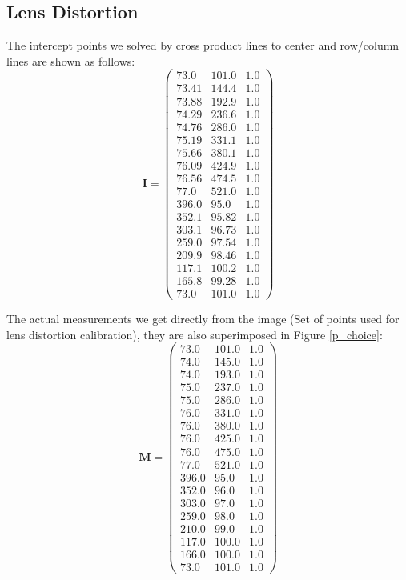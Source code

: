 \documentclass[conference]{IEEEtran}
\newcommand{\mat}[1]{\mathbf{#1}} %
\begin{document}
\subsection{Lens Distortion}
The intercept points we solved by cross product lines to center and row/column lines are shown as follows:
\begin{equation}
	\mat{I} = \left(\begin{array}{ccc} 73.0 & 101.0 & 1.0\\ 73.41 & 144.4 & 1.0\\ 73.88 & 192.9 & 1.0\\ 74.29 & 236.6 & 1.0\\ 74.76 & 286.0 & 1.0\\ 75.19 & 331.1 & 1.0\\ 75.66 & 380.1 & 1.0\\ 76.09 & 424.9 & 1.0\\ 76.56 & 474.5 & 1.0\\ 77.0 & 521.0 & 1.0\\ 396.0 & 95.0 & 1.0\\ 352.1 & 95.82 & 1.0\\ 303.1 & 96.73 & 1.0\\ 259.0 & 97.54 & 1.0\\ 209.9 & 98.46 & 1.0\\ 117.1 & 100.2 & 1.0\\ 165.8 & 99.28 & 1.0\\ 73.0 & 101.0 & 1.0 \end{array}\right)
\end{equation}

The actual measurements we get directly from the image (Set of points used for lens distortion calibration), they are also superimposed in Figure \ref{p_choice}:
\begin{equation}
	\mat{M} = \left(\begin{array}{ccc} 73.0 & 101.0 & 1.0\\ 74.0 & 145.0 & 1.0\\ 74.0 & 193.0 & 1.0\\ 75.0 & 237.0 & 1.0\\ 75.0 & 286.0 & 1.0\\ 76.0 & 331.0 & 1.0\\ 76.0 & 380.0 & 1.0\\ 76.0 & 425.0 & 1.0\\ 76.0 & 475.0 & 1.0\\ 77.0 & 521.0 & 1.0\\ 396.0 & 95.0 & 1.0\\ 352.0 & 96.0 & 1.0\\ 303.0 & 97.0 & 1.0\\ 259.0 & 98.0 & 1.0\\ 210.0 & 99.0 & 1.0\\ 117.0 & 100.0 & 1.0\\ 166.0 & 100.0 & 1.0\\ 73.0 & 101.0 & 1.0 \end{array}\right)
\end{equation}
\end{document}
